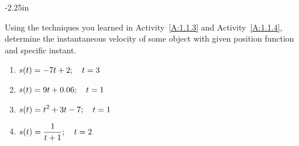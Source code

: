 \begin{adjustwidth*}{}{-2.25in}
\begin{multicols*}{2}
\noindent Using the techniques you learned in Activity~\ref{A:1.1.3} and Activity~\ref{A:1.1.4}, determine the instantaneous velocity of some object with given position function and specific instant.
\begin{enumerate}[1),start=44]
\item $\displaystyle s(t) = -7t + 2; \quad t=3$
\item $\displaystyle s(t) = 9t + 0.06; \quad t=1$
\item $\displaystyle s(t) = t^2 + 3t - 7; \quad t=1$
\item $\displaystyle s(t) = \frac{1}{t+1}; \quad t=2$
\end{enumerate}

\end{multicols*}
\end{adjustwidth*}
\afterexercises